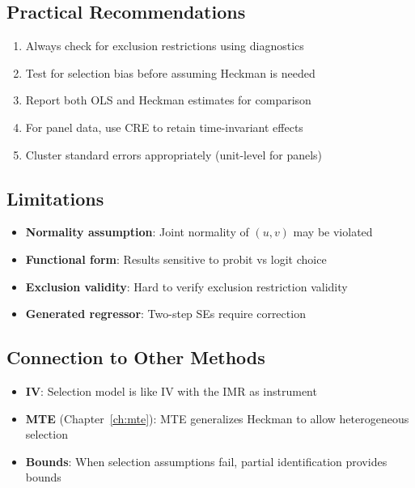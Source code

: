 \subsection{Practical Recommendations}

\begin{enumerate}
\item Always check for exclusion restrictions using diagnostics
\item Test for selection bias before assuming Heckman is needed
\item Report both OLS and Heckman estimates for comparison
\item For panel data, use CRE to retain time-invariant effects
\item Cluster standard errors appropriately (unit-level for panels)
\end{enumerate}

\subsection{Limitations}

\begin{itemize}
\item \textbf{Normality assumption}: Joint normality of $(u, v)$ may be violated
\item \textbf{Functional form}: Results sensitive to probit vs logit choice
\item \textbf{Exclusion validity}: Hard to verify exclusion restriction validity
\item \textbf{Generated regressor}: Two-step SEs require correction
\end{itemize}

\subsection{Connection to Other Methods}

\begin{itemize}
\item \textbf{IV}: Selection model is like IV with the IMR as instrument
\item \textbf{MTE} (Chapter~\ref{ch:mte}): MTE generalizes Heckman to allow heterogeneous selection
\item \textbf{Bounds}: When selection assumptions fail, partial identification provides bounds
\end{itemize}
